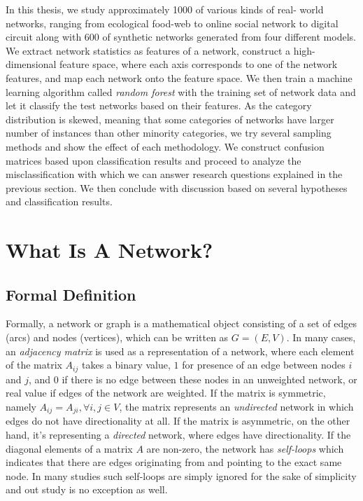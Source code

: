 \documentclass{article}
\begin{document}
In this thesis, we study approximately 1000 of various kinds of real- world networks, ranging from ecological food-web to online social network to digital circuit along with 600 of synthetic networks generated from four different models.  We extract network statistics as features of a network, construct a high-dimensional feature space, where each axis corresponds to one of the network features, and map each network onto the feature space. We then train a machine learning algorithm called \textit{random forest} with the training set of network data and let it classify the test networks based on their features. As the category distribution is skewed, meaning that some categories of networks have larger number of instances than other minority categories, we try several sampling methods and show the effect of each methodology. We construct confusion matrices based upon classification results and proceed to analyze the misclassification with which we can answer research questions explained in the previous section. We then conclude with discussion based on several hypotheses and classification results.



\section{What Is A Network?}
	\subsection{Formal Definition}
	Formally, a network or graph is a mathematical object consisting of a set of edges (arcs) and nodes (vertices), which can be written as $G = (E,V)$. In many cases, an \textit{adjacency matrix} is used as a representation of a network, where each element of the matrix $A_{ij}$ takes a binary value, $1$ for presence of an edge between nodes $i$ and $j$, and $0$ if there is no edge between these nodes in an unweighted network, or real value if edges of the network are weighted. If the matrix is symmetric, namely $A_{ij} = A_{ji},  \forall i,j \in V$, the matrix represents an \textit{undirected} network in which edges do not have directionality at all. If the matrix is asymmetric, on the other hand, it's representing a \textit{directed} network, where edges have directionality. If the diagonal elements of a matrix $A$ are non-zero, the network has \textit{self-loops} which indicates that there are edges originating from and pointing to the exact same node. In many studies such self-loops are simply ignored for the sake of simplicity and out study is no exception as well.
	
\end{document}

